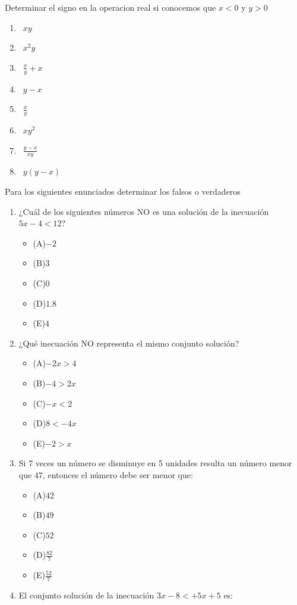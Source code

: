 \documentclass[]{book}
\theoremstyle{definition}
\theoremstyle{definition}
\theoremstyle{definition}
\theoremstyle{remark}
\begin{document}
Determinar el signo en la operacion real si conocemos que \(x<0\) y \(y>0\)

\begin{enumerate}
	\item \ $xy$
	\item \ $x^2y$
	\item \ $\frac{x}{y}+x$
	\item \ $y-x$
	\item \ $\frac{x}{y}$
	\item \ $xy^2$
	\item \ $\frac{y-x}{xy}$
	\item \ $y(y-x)$
\end{enumerate}

Para los siguientes enunciados determinar los falsos o verdaderos

\begin{enumerate}
	\item ¿Cuál de los siguientes números NO es una solución de la inecuación $5x-4<12$?
	
\begin{itemize}
	\item (A)$-2$
	\item (B)$3$
	\item (C)$0$
	\item (D)$1.8$
	\item (E)$4$
\end{itemize}
	\item ¿Qué inecuación NO representa el mismo conjunto solución?
	
\begin{itemize}
	\item (A)$-2x>4$
	\item (B)$-4>2x$
	\item (C)$-x<2$
	\item (D)$8<-4x$
	\item (E)$-2>x$
\end{itemize}
	\item Si $7$ veces un número se disminuye en 5 unidades resulta un número menor que $47$, entonces el número debe ser menor que:
	
\begin{itemize}
	\item (A)$42$
	\item (B)$49$
	\item (C)$52$
	\item (D)$\frac{82}{7}$
	\item (E)$\frac{52}{7}$
\end{itemize}
	\item El conjunto solución de la inecuación $3x-8<+5x+5$ es:
	

\end{enumerate}
\end{document}
